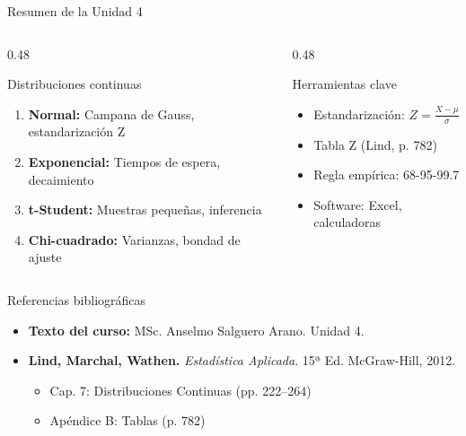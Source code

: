 \documentclass[10pt]{beamer}
\begin{document}
\begin{frame}{Resumen de la Unidad 4}
\begin{columns}[T]
\begin{column}{0.48\textwidth}
\begin{block}{Distribuciones continuas}
\begin{enumerate}
  \item \textbf{Normal:} Campana de Gauss, estandarización Z
  \item \textbf{Exponencial:} Tiempos de espera, decaimiento
  \item \textbf{t-Student:} Muestras pequeñas, inferencia
  \item \textbf{Chi-cuadrado:} Varianzas, bondad de ajuste
\end{enumerate}
\end{block}
\end{column}
\begin{column}{0.48\textwidth}
\begin{exampleblock}{Herramientas clave}
\begin{itemize}
  \item Estandarización: $Z = \frac{X-\mu}{\sigma}$
  \item Tabla Z (Lind, p. 782)
  \item Regla empírica: 68-95-99.7
  \item Software: Excel, calculadoras
\end{itemize}
\end{exampleblock}
\end{column}
\end{columns}

\vspace{0.3cm}
\begin{alertblock}{Referencias bibliográficas}
\begin{itemize}
  \item \textbf{Texto del curso:} MSc. Anselmo Salguero Arano. Unidad 4.
  \item \textbf{Lind, Marchal, Wathen.} \textit{Estadística Aplicada}. 15ª Ed. McGraw-Hill, 2012.
  \begin{itemize}
    \item Cap. 7: Distribuciones Continuas (pp. 222--264)
    \item Apéndice B: Tablas (p. 782)
  \end{itemize}
\end{itemize}
\end{alertblock}
\end{frame}
\end{document}
